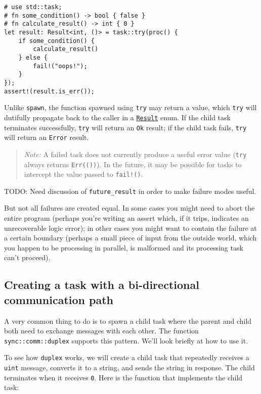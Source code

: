 \documentclass[]{article}
\begin{document}
\begin{verbatim}
# use std::task;
# fn some_condition() -> bool { false }
# fn calculate_result() -> int { 0 }
let result: Result<int, ()> = task::try(proc() {
    if some_condition() {
        calculate_result()
    } else {
        fail!("oops!");
    }
});
assert!(result.is_err());
\end{verbatim}

Unlike \texttt{spawn}, the function spawned using \texttt{try} may
return a value, which \texttt{try} will dutifully propagate back to the
caller in a \href{std/result/index.html}{\texttt{Result}} enum. If the
child task terminates successfully, \texttt{try} will return an
\texttt{Ok} result; if the child task fails, \texttt{try} will return an
\texttt{Error} result.

\begin{quote}
\emph{Note:} A failed task does not currently produce a useful error
value (\texttt{try} always returns \texttt{Err(())}). In the future, it
may be possible for tasks to intercept the value passed to
\texttt{fail!()}.
\end{quote}

TODO: Need discussion of \texttt{future\_result} in order to make
failure modes useful.

But not all failures are created equal. In some cases you might need to
abort the entire program (perhaps you're writing an assert which, if it
trips, indicates an unrecoverable logic error); in other cases you might
want to contain the failure at a certain boundary (perhaps a small piece
of input from the outside world, which you happen to be processing in
parallel, is malformed and its processing task can't proceed).

\subsection{Creating a task with a bi-directional communication
path}\label{creating-a-task-with-a-bi-directional-communication-path}

A very common thing to do is to spawn a child task where the parent and
child both need to exchange messages with each other. The function
\texttt{sync::comm::duplex} supports this pattern. We'll look briefly at
how to use it.

To see how \texttt{duplex} works, we will create a child task that
repeatedly receives a \texttt{uint} message, converts it to a string,
and sends the string in response. The child terminates when it receives
\texttt{0}. Here is the function that implements the child task:
\end{document}
